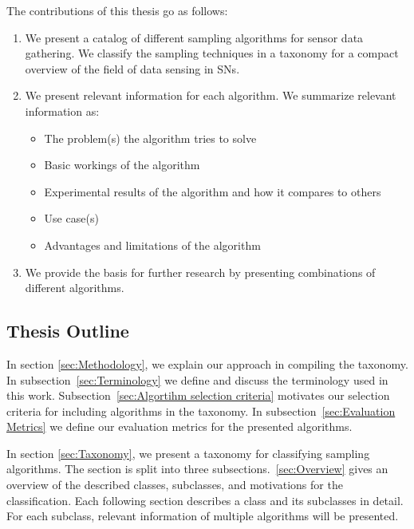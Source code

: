 The contributions of this thesis go as follows: 
\begin{enumerate}
    \item We present a catalog of different sampling algorithms for sensor data
    gathering. We classify the sampling techniques in a taxonomy for a compact
    overview of the field of data sensing in \acp{SN}.
    \item We present relevant information for each algorithm. We summarize
    relevant information as:

        \begin{itemize}
            \item The problem(s) the algorithm tries to solve
            \item Basic workings of the algorithm
            \item Experimental results of the algorithm and how it compares to others
            \item Use case(s)
            \item Advantages and limitations of the algorithm
        \end{itemize}

    \item We provide the basis for further research by presenting combinations
    of different algorithms.
\end{enumerate}


\subsection{Thesis Outline}

  In section \ref{sec:Methodology}, we
explain our approach in compiling the taxonomy. In
subsection~\ref{sec:Terminology} we define and discuss the terminology used in
this work. Subsection~\ref{sec:Algortihm selection criteria} motivates our
selection criteria for including algorithms in the taxonomy. In
subsection~\ref{sec:Evaluation Metrics} we define our evaluation metrics for
the presented algorithms.

  In section \ref{sec:Taxonomy}, we present a
taxonomy for classifying sampling algorithms. The section is split into three
subsections.~\ref{sec:Overview} gives an overview of the described classes,
subclasses, and motivations for the classification. Each following section
describes a class and its subclasses in detail. For each subclass, relevant
information of multiple algorithms will be presented. 

